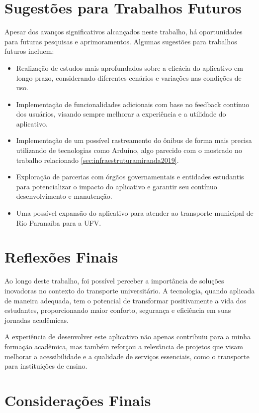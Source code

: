\documentclass[
    12pt,                   %
    openright,              %
    oneside,                %
    a4paper,                %
    sumario=tradicional,    %
    english,                %
    brazil,                 %
    ]{abntex2}
\begin{document}
\section{Sugestões para Trabalhos Futuros}

Apesar dos avanços significativos alcançados neste trabalho, há oportunidades para futuras pesquisas e aprimoramentos. Algumas sugestões para trabalhos futuros incluem:

\begin{itemize}
    \item Realização de estudos mais aprofundados sobre a eficácia do aplicativo em longo prazo, considerando diferentes cenários e variações nas condições de uso.
    \item Implementação de funcionalidades adicionais com base no feedback contínuo dos usuários, visando sempre melhorar a experiência e a utilidade do aplicativo.
    \item Implementação de um possível rastreamento do ônibus de forma mais precisa utilizando de tecnologias como Arduíno, algo parecido com o mostrado no trabalho relacionado \ref{sec:infraestruturamiranda2019}.
    \item Exploração de parcerias com órgãos governamentais e entidades estudantis para potencializar o impacto do aplicativo e garantir seu contínuo desenvolvimento e manutenção.
    \item Uma possível expansão do aplicativo para atender ao transporte municipal de Rio Paranaíba para a UFV.
\end{itemize}

\section{Reflexões Finais}

Ao longo deste trabalho, foi possível perceber a importância de soluções inovadoras no contexto do transporte universitário. A tecnologia, quando aplicada de maneira adequada, tem o potencial de transformar positivamente a vida dos estudantes, proporcionando maior conforto, segurança e eficiência em suas jornadas acadêmicas.

A experiência de desenvolver este aplicativo não apenas contribuiu para a minha formação acadêmica, mas também reforçou a relevância de projetos que visam melhorar a acessibilidade e a qualidade de serviços essenciais, como o transporte para instituições de ensino.

\section{Considerações Finais}
\end{document}
